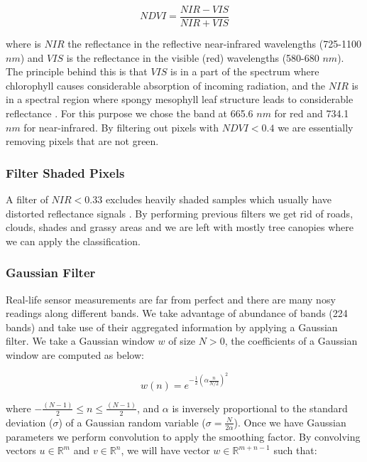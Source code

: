 \documentclass[remotesensing,article,accept,moreauthors,pdftex,12pt,a4paper]{mdpi}
\begin{document}
\begin{equation}\label{xx}
NDVI  = \frac{NIR - VIS}{NIR + VIS}
\end{equation}

where is $NIR$ the reflectance in the reflective near-infrared wavelengths (725-1100 $n m$) and $VIS$ is the reflectance in the visible (red) wavelengths (580-680 $n m$). The principle behind this is that $VIS$ is in a part of the spectrum where chlorophyll causes considerable absorption of incoming radiation, and the $NIR$ is in a spectral region where spongy mesophyll leaf structure leads to considerable reflectance \cite{tucker1979red, jackson1983discrimination}. For this purpose we chose the band at 665.6 $n m$ for red and 734.1 $n m$ for near-infrared. By filtering out pixels with $NDVI < 0.4$ we are essentially removing pixels that are not green. 

\subsubsection{Filter Shaded Pixels}

A filter of $NIR < 0.33$  excludes heavily shaded samples  which usually have distorted reflectance signals \cite{colgan2012mapping}. By performing previous filters we get rid of roads, clouds, shades and grassy areas and we are left with mostly tree canopies where we can apply the classification.

\subsubsection{Gaussian Filter}

Real-life sensor measurements are far from perfect and there are many nosy readings along different bands. We take advantage of abundance of bands (224 bands) and take use of their aggregated information by applying a Gaussian filter. We take a Gaussian window $w$ of size $N > 0$, the coefficients of a Gaussian window are computed as below:

\begin{equation}
w(n) = e^{-\frac{1}{2}(\alpha \frac{n}{N/2})^2}
\end{equation}  

where $-\frac{(N-1)}{2} \leq n \leq \frac{(N-1)}{2}$, and $\alpha$ is inversely proportional to the standard deviation ($\sigma$) of a Gaussian random variable ($\sigma = \frac{N}{2\alpha}$). Once we have Gaussian parameters we perform convolution to apply the smoothing factor. By convolving vectors $u \in \mathbb{R}^m$ and $v\in \mathbb{R}^n$, we will have vector $w\in \mathbb{R}^{m+n-1}$ such that: 
\end{document}
